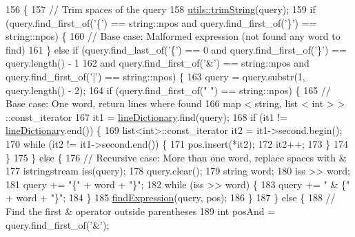 \begin{DoxyCode}
156                                                      \{
157     \textcolor{comment}{// Trim spaces of the query}
158     \hyperlink{namespaceutils_a9f184d101ac739ab058355ab5413ca9a}{utils::trimString}(query);
159     \textcolor{keywordflow}{if} (query.find\_first\_of(\textcolor{charliteral}{'\{'}) == string::npos and query.find\_first\_of(\textcolor{charliteral}{'\}'}) == string::npos) \{
160         \textcolor{comment}{// Base case: Malformed expression (not found any word to find)}
161     \} \textcolor{keywordflow}{else} \textcolor{keywordflow}{if} (query.find\_last\_of(\textcolor{charliteral}{'\{'}) == 0 and query.find\_first\_of(\textcolor{charliteral}{'\}'}) == query.length() - 1
162                and query.find\_first\_of(\textcolor{charliteral}{'&'}) == string::npos and query.find\_first\_of(\textcolor{charliteral}{'|'}) == string::npos) \{
163         query = query.substr(1, query.length() - 2);
164         \textcolor{keywordflow}{if} (query.find\_first\_of(\textcolor{stringliteral}{" "}) == string::npos) \{
165             \textcolor{comment}{// Base case: One word, return lines where found}
166             map < string, list < int > > ::const\_iterator
167             it1 = \hyperlink{class_book_a7da5c2f5239458c2ab88576cac8d0a10}{lineDictionary}.find(query);
168             \textcolor{keywordflow}{if} (it1 != \hyperlink{class_book_a7da5c2f5239458c2ab88576cac8d0a10}{lineDictionary}.end()) \{
169                 list<int>::const\_iterator it2 = it1->second.begin();
170                 \textcolor{keywordflow}{while} (it2 != it1->second.end()) \{
171                     pos.insert(*it2);
172                     it2++;
173                 \}
174             \}
175         \} \textcolor{keywordflow}{else} \{
176             \textcolor{comment}{// Recursive case: More than one word, replace spaces with &}
177             istringstream iss(query);
178             query.clear();
179             \textcolor{keywordtype}{string} word;
180             iss >> word;
181             query += \textcolor{stringliteral}{"\{"} + word + \textcolor{stringliteral}{"\}"};
182             \textcolor{keywordflow}{while} (iss >> word) \{
183                 query += \textcolor{stringliteral}{" & \{"} + word + \textcolor{stringliteral}{"\}"};
184             \}
185             \hyperlink{class_book_acc3fa87ab1c8eb2186a4c2e1e541f368}{findExpression}(query, pos);
186         \}
187     \} \textcolor{keywordflow}{else} \{
188         \textcolor{comment}{// Find the first & operator outside parentheses}
189         \textcolor{keywordtype}{int} posAnd = query.find\_first\_of(\textcolor{charliteral}{'&'});

\end{DoxyCode}

